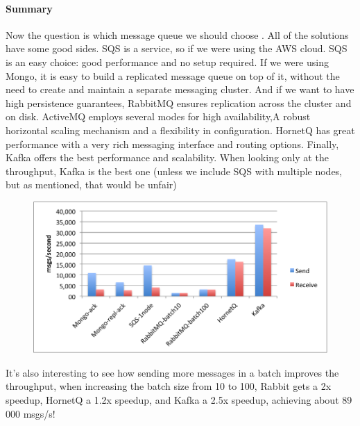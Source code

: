 \paragraph{Summary}
Now the question is which message queue we should choose . All of the solutions have some good sides.
SQS is a service, so  if we were using the AWS cloud. SQS is an easy choice: good performance and no 
setup required. If we were using Mongo, it is easy to build a replicated message queue on top of it, without the need to 
create and maintain a separate messaging cluster. And if we want to have high persistence guarantees, RabbitMQ ensures replication across 
the cluster and on disk. ActiveMQ employs several modes for high availability,A robust horizontal scaling mechanism and 
  a flexibility in configuration. HornetQ has great performance with a very rich messaging interface and routing options. Finally, Kafka offers the best performance 
and scalability. When looking only at the throughput, Kafka is the best one (unless we include SQS with multiple nodes, but as mentioned, that would be unfair)
\newpage
\begin{figure}[h!]
	\centering
	\includegraphics[height=0.3\textheight]{fig01/kafkaBenshMark}
	\label{fig:FilialesEtClients}
\end{figure}
It's also interesting to see how sending more messages in a batch improves the throughput, when increasing the batch size from 10 to 100, Rabbit gets a 2x speedup, HornetQ a 1.2x speedup, and Kafka a 2.5x speedup, achieving about 89 000 msgs/s!

